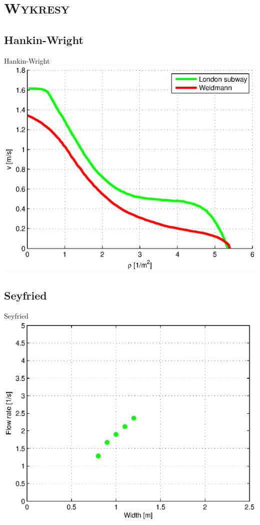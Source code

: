 \section{\scshape Wykresy}

\subsection{Hankin-Wright}
\begin{frame}{Hankin-Wright}
\includegraphics[width=\textwidth,height=0.8\textheight]{wykresy-hankin-wright}
\end{frame}

\subsection{Seyfried}
\begin{frame}{Seyfried}
\includegraphics[width=\textwidth,height=0.8\textheight]{wykresy-seyfried}
\end{frame}

